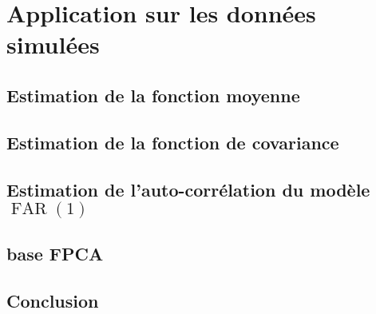 \chapter{
  Application sur les données simulées
 }
\minitoc%

\section{Estimation de la fonction moyenne}

\section{Estimation de la fonction de covariance}

\section{Estimation de l'auto-corrélation du modèle $\operatorname{FAR}(1)$}

\section{base FPCA}

\section{Conclusion}